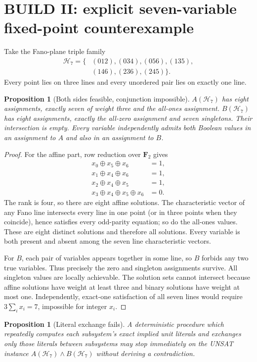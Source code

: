 \documentclass[11pt]{article}
\newtheorem{proposition}[theorem]{Proposition}
\newcommand{\Ftwo}{\mathbf F_2}
\begin{document}
\section{BUILD II: explicit seven-variable fixed-point counterexample}
Take the Fano-plane triple family
\[
\begin{split}
\mathcal H_7=\{&(012),(034),(056),(135),\\
                    &(146),(236),(245)\}.
\end{split}
\]
Every point lies on three lines and every unordered pair lies on exactly one line.
\begin{proposition}[Both sides feasible, conjunction impossible]
$A(\mathcal H_7)$ has eight assignments, exactly seven of weight three and the all-ones assignment. $B(\mathcal H_7)$ has eight assignments, exactly the all-zero assignment and seven singletons. Their intersection is empty. Every variable independently admits both Boolean values in an assignment to $A$ and also in an assignment to $B$.
\end{proposition}
\begin{proof}
For the affine part, row reduction over $\Ftwo$ gives
\[
\begin{array}{rl}
x_0\oplus x_5\oplus x_6&=1,\\
x_1\oplus x_4\oplus x_6&=1,\\
x_2\oplus x_4\oplus x_5&=1,\\
x_3\oplus x_4\oplus x_5\oplus x_6&=0.
\end{array}
\]
The rank is four, so there are eight affine solutions. The characteristic vector of any Fano line intersects every line in one point (or in three points when they coincide), hence satisfies every odd-parity equation; so do the all-ones values. These are eight distinct solutions and therefore all solutions. Every variable is both present and absent among the seven line characteristic vectors.

For $B$, each pair of variables appears together in some line, so $B$ forbids any two true variables. Thus precisely the zero and singleton assignments survive. All singleton values are locally achievable. The solution sets cannot intersect because affine solutions have weight at least three and binary solutions have weight at most one. Independently, exact-one satisfaction of all seven lines would require $3\sum_i x_i=7$, impossible for integer $x_i$.
\end{proof}
\begin{proposition}[Literal exchange fails]
A deterministic procedure which repeatedly computes each subsystem's exact implied unit literals and exchanges only those literals between subsystems may stop immediately on the UNSAT instance $A(\mathcal H_7)\wedge B(\mathcal H_7)$ without deriving a contradiction.
\end{proposition}
\end{document}
